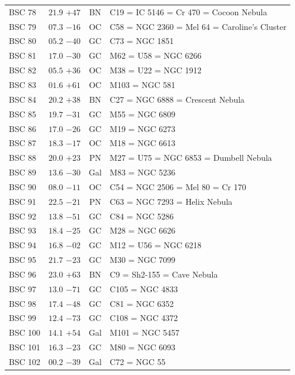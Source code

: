 \begin{table}[t]
\begin{tabularx}{\linewidth}{lccX}
BSC 78 &$21.9$ $+47$&BN &C19 = IC 5146 = Cr 470 = Cocoon Nebula\\
BSC 79 &$07.3$ $-16$&OC &C58 = NGC 2360 = Mel 64 = Caroline's Cluster\\
BSC 80 &$05.2$ $-40$&GC &C73 = NGC 1851\\
BSC 81 &$17.0$ $-30$&GC &M62 = U58 = NGC 6266\\
BSC 82 &$05.5$ $+36$&OC &M38 = U22 = NGC 1912\\
BSC 83 &$01.6$ $+61$&OC &M103 = NGC 581\\
BSC 84 &$20.2$ $+38$&BN &C27 = NGC 6888 = Crescent Nebula\\
BSC 85 &$19.7$ $-31$&GC &M55 = NGC 6809\\
BSC 86 &$17.0$ $-26$&GC &M19 = NGC 6273\\
BSC 87 &$18.3$ $-17$&OC &M18 = NGC 6613\\
BSC 88 &$20.0$ $+23$&PN &M27 = U75 = NGC 6853 = Dumbell Nebula\\
BSC 89 &$13.6$ $-30$&Gal&M83 = NGC 5236\\
BSC 90 &$08.0$ $-11$&OC &C54 = NGC 2506 = Mel 80 = Cr 170\\
BSC 91 &$22.5$ $-21$&PN &C63 = NGC 7293 = Helix Nebula\\
BSC 92 &$13.8$ $-51$&GC &C84 = NGC 5286\\
BSC 93 &$18.4$ $-25$&GC &M28 = NGC 6626\\
BSC 94 &$16.8$ $-02$&GC &M12 = U56 = NGC 6218\\
BSC 95 &$21.7$ $-23$&GC &M30 = NGC 7099\\
BSC 96 &$23.0$ $+63$&BN &C9 = Sh2-155 = Cave Nebula\\
BSC 97 &$13.0$ $-71$&GC &C105 = NGC 4833\\
BSC 98 &$17.4$ $-48$&GC &C81 = NGC 6352\\
BSC 99 &$12.4$ $-73$&GC &C108 = NGC 4372\\
BSC 100 &$14.1$ $+54$&Gal&M101 = NGC 5457\\
BSC 101 &$16.3$ $-23$&GC &M80 = NGC 6093\\
BSC 102 &$00.2$ $-39$&Gal&C72 = NGC 55\\

        \hline
    \end{tabularx}
\end{table}
\clearpage


